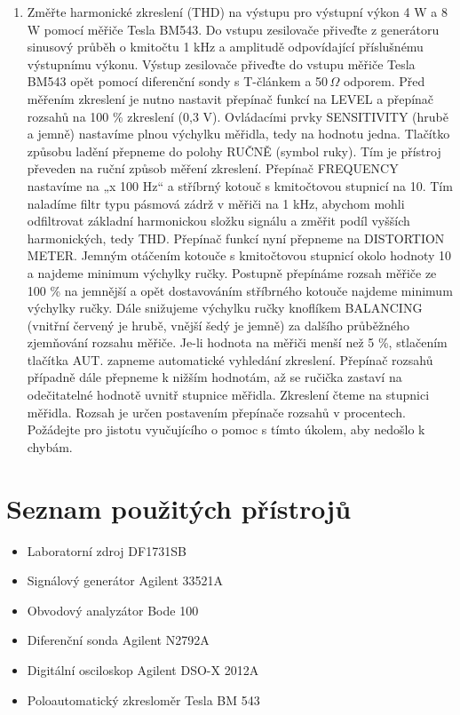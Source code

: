 \documentclass[a4paper, czech]{article}
\begin{document}
\begin{enumerate}
    \item Změřte harmonické zkreslení (THD) na výstupu pro výstupní výkon 4 W a 8 W pomocí měřiče Tesla BM543. Do vstupu zesilovače přiveďte z generátoru sinusový průběh o kmitočtu 1 kHz a amplitudě odpovídající příslušnému výstupnímu výkonu. Výstup zesilovače přiveďte do vstupu měřiče Tesla BM543 opět pomocí diferenční sondy s T-článkem a 50\,$\Omega$ odporem. Před měřením zkreslení je nutno nastavit přepínač funkcí na LEVEL a přepínač rozsahů na 100 \% zkreslení (0,3 V). Ovládacími prvky SENSITIVITY (hrubě a jemně) nastavíme plnou výchylku měřidla, tedy na hodnotu jedna. Tlačítko způsobu ladění přepneme do polohy RUČNĚ (symbol ruky). Tím je přístroj převeden na ruční způsob měření zkreslení. Přepínač FREQUENCY nastavíme na „x 100 Hz“ a stříbrný kotouč s kmitočtovou stupnicí na 10. Tím naladíme filtr typu pásmová zádrž v měřiči na 1 kHz, abychom mohli odfiltrovat základní harmonickou složku signálu a změřit podíl vyšších harmonických, tedy THD. Přepínač funkcí nyní přepneme na DISTORTION METER. Jemným otáčením kotouče s kmitočtovou stupnicí okolo hodnoty 10 a najdeme minimum výchylky ručky. Postupně přepínáme rozsah měřiče ze 100 \% na jemnější a opět dostavováním stříbrného kotouče najdeme minimum výchylky ručky. Dále snižujeme výchylku ručky knoflíkem BALANCING (vnitřní červený je hrubě, vnější šedý je jemně) za dalšího průběžného zjemňování rozsahu měřiče. Je-li hodnota na měřiči menší než 5 \%, stlačením tlačítka AUT. zapneme automatické vyhledání zkreslení. Přepínač rozsahů případně dále přepneme k nižším hodnotám, až se ručička zastaví na odečitatelné hodnotě uvnitř stupnice měřidla. Zkreslení čteme na stupnici měřidla. Rozsah je určen postavením přepínače rozsahů v procentech. Požádejte pro jistotu vyučujícího o pomoc s tímto úkolem, aby nedošlo k chybám.
\end{enumerate}

\section{Seznam použitých přístrojů}

\begin{itemize}
    \item Laboratorní zdroj DF1731SB
    \item Signálový generátor Agilent 33521A
    \item Obvodový analyzátor Bode 100
    \item Diferenční sonda Agilent N2792A
    \item Digitální osciloskop Agilent DSO-X 2012A
    \item Poloautomatický zkresloměr Tesla BM 543
\end{itemize}
\end{document}
